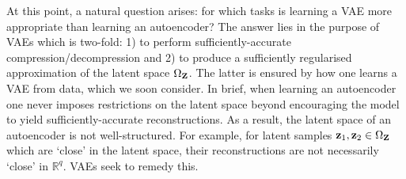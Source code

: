 \documentclass[11pt]{article}
\begin{document}
At this point, a natural question arises: for which tasks is learning a VAE more appropriate than learning an autoencoder? The answer lies in the purpose of VAEs which is two-fold: 1) to perform sufficiently-accurate compression/decompression and 2) to produce a sufficiently regularised approximation of the latent space $\Omega_{\mathbf{Z}}$. The latter is ensured by how one learns a VAE from data, which we soon consider. In brief, when learning an autoencoder one never imposes restrictions on the latent space beyond encouraging the model to yield sufficiently-accurate reconstructions. As a result, the latent space of an autoencoder is not well-structured. For example, for latent samples $\mathbf{z}_1,\mathbf{z}_2\in\Omega_{\mathbf{Z}}$ which are `close' in the latent space, their reconstructions are not necessarily `close' in $\mathbb{R}^q$. VAEs seek to remedy this.
\end{document}
